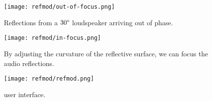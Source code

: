 \begin{figure}[]
  \texttt{[image: refmod/out-of-focus.png]}
  \caption[]{Reflections from a $30\degree$ loudspeaker arriving out of phase.}
  \label{fig:refmod-bad-focus}
\end{figure}

\begin{figure}[]
  \texttt{[image: refmod/in-focus.png]}
  \caption[]{By adjusting the curvature of the reflective surface, we
    can focus the audio reflections.}
  \label{fig:refmod-good-focus}
\end{figure}


\begin{figure*}[]
  \texttt{[image: refmod/refmod.png]}
  \caption[]{ user interface.}
  \label{fig:refmod-full}
\end{figure*}


